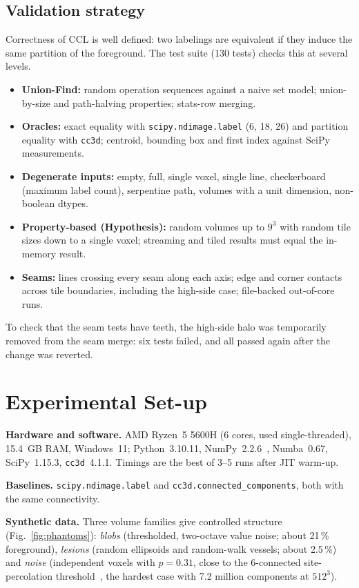 \documentclass[11pt,a4paper]{article}
\begin{document}
\subsection{Validation strategy}
Correctness of CCL is well defined: two labelings are equivalent if they induce the same partition of the foreground. The test suite (130 tests) checks this at several levels.
\begin{itemize}
  \item \textbf{Union-Find:} random operation sequences against a naive set model; union-by-size and path-halving properties; stats-row merging.
  \item \textbf{Oracles:} exact equality with \texttt{scipy.ndimage.label} (6, 18, 26) and partition equality with \texttt{cc3d}; centroid, bounding box and first index against SciPy measurements.
  \item \textbf{Degenerate inputs:} empty, full, single voxel, single line, checkerboard (maximum label count), serpentine path, volumes with a unit dimension, non-boolean dtypes.
  \item \textbf{Property-based (Hypothesis):} random volumes up to $9^3$ with random tile sizes down to a single voxel; streaming and tiled results must equal the in-memory result.
  \item \textbf{Seams:} lines crossing every seam along each axis; edge and corner contacts across tile boundaries, including the high-side case; file-backed out-of-core runs.
\end{itemize}
To check that the seam tests have teeth, the high-side halo was temporarily removed from the seam merge: six tests failed, and all passed again after the change was reverted.

\section{Experimental Set-up}
\textbf{Hardware and software.} AMD Ryzen~5 5600H (6 cores, used single-threaded), 15.4~GB RAM, Windows~11; Python~3.10.11, NumPy~2.2.6~\cite{numpy2020}, Numba~0.67, SciPy~1.15.3, \texttt{cc3d}~4.1.1. Timings are the best of 3--5 runs after JIT warm-up.

\textbf{Baselines.} \texttt{scipy.ndimage.label} and \texttt{cc3d.connected\_components}, both with the same connectivity.

\textbf{Synthetic data.} Three volume families give controlled structure (Fig.~\ref{fig:phantoms}): \emph{blobs} (thresholded, two-octave value noise; about 21\,\% foreground), \emph{lesions} (random ellipsoids and random-walk vessels; about 2.5\,\%) and \emph{noise} (independent voxels with $p=0.31$, close to the 6-connected site-percolation threshold~\cite{stauffer1994}, the hardest case with 7.2 million components at $512^3$).
\end{document}
